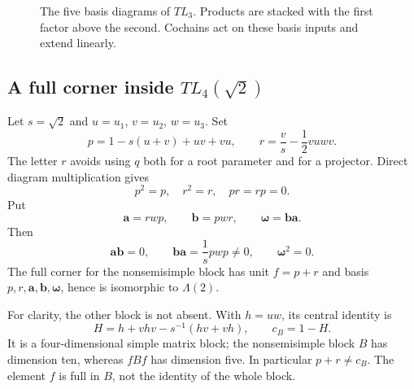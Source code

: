 \documentclass[a4paper,11pt,oneside,reqno]{amsart}
\theoremstyle{definition}
\numberwithin{equation}{section}
\begin{document}
\begin{figure}[htbp]
		\caption{The five basis diagrams of $TL_3$. Products are stacked with the first factor above the second. Cochains act on these basis inputs and extend linearly.}
		\label{fig:TL3basis}
	\end{figure}
	
	\subsection{A full corner inside \texorpdfstring{$TL_4(\sqrt2)$}{TL4(sqrt2)}}
	Let $s=\sqrt2$ and $u=u_1$, $v=u_2$, $w=u_3$.
	Set
	\begin{equation}\label{tl:TL4projectors}
		p=1-s(u+v)+uv+vu,
		\qquad r=\frac v s-\frac12vuwv.
	\end{equation}
	The letter $r$ avoids using $q$ both for a root parameter and for a
	projector.  Direct diagram multiplication gives
	\[
	p^2=p,\quad r^2=r,\quad pr=rp=0.
	\]
	Put
	\[
	\mathbf{a}=rwp,\qquad \mathbf{b}=pwr,\qquad \boldsymbol{\omega}=\mathbf{b}\mathbf{a}.
	\]
	Then
	\begin{equation}\label{tl:TL4arrows}
		\mathbf{a}\mathbf{b}=0,\qquad \mathbf{b}\mathbf{a}=\frac1s pwp\ne0,\qquad \boldsymbol{\omega}^2=0.
	\end{equation}
	The full corner for the nonsemisimple block has unit $f=p+r$ and
	basis $p,r,\mathbf{a},\mathbf{b},\boldsymbol{\omega}$, hence is isomorphic to $\Lambda(2)$.
	
	For clarity, the other block is not absent.  With $h=uw$, its
	central identity is
	\begin{equation}\label{tl:Hmatrix}
		H=h+vhv-s^{-1}(hv+vh),\qquad c_B=1-H.
	\end{equation}
	It is a four-dimensional simple matrix block; the nonsemisimple
	block $B$ has dimension ten, whereas $fBf$ has dimension five.
	In particular $p+r\ne c_B$.  The element $f$ is full in $B$,
	not the identity of the whole block.
	
\end{document}
